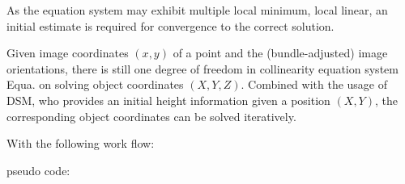 As the equation system may exhibit multiple local minimum, local linear, an initial estimate is required for convergence to the correct solution. 

Given image coordinates $(x,y)$ of a point and the (bundle-adjusted) image orientations, there is still one degree of freedom in collinearity equation system Equa. on solving object coordinates $(X,Y,Z)$. Combined with the usage of DSM, who provides an initial height information given a position $(X,Y)$, the corresponding object coordinates can be solved iteratively.

With the following work flow:

pseudo code:















